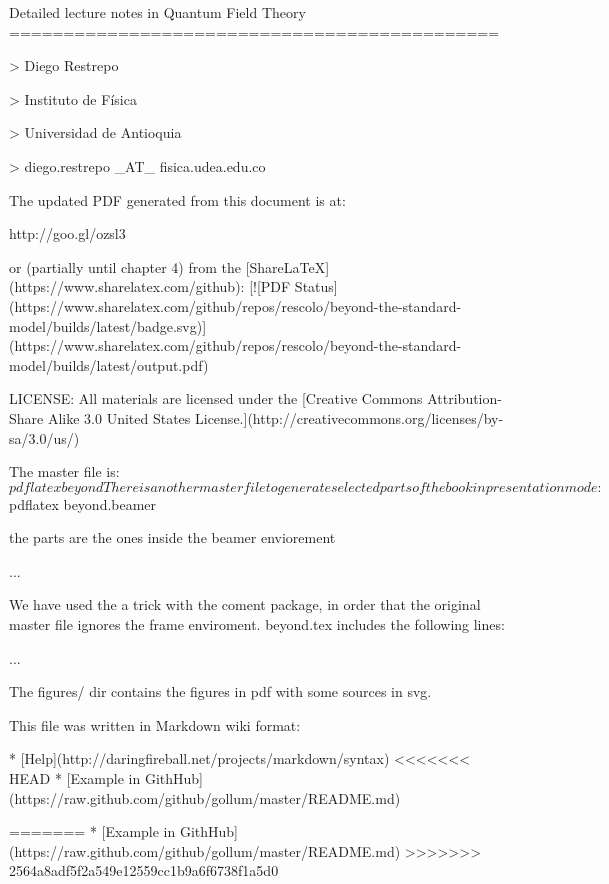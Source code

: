 Detailed lecture notes in Quantum Field Theory
=============================================



> Diego Restrepo

> Instituto de Física

> Universidad de Antioquia

> diego.restrepo _AT_ fisica.udea.edu.co

The updated PDF generated from this document is at:

http://goo.gl/ozsl3

or (partially until chapter 4) from the [ShareLaTeX](https://www.sharelatex.com/github): [![PDF Status](https://www.sharelatex.com/github/repos/rescolo/beyond-the-standard-model/builds/latest/badge.svg)](https://www.sharelatex.com/github/repos/rescolo/beyond-the-standard-model/builds/latest/output.pdf)

LICENSE: All materials are licensed under the [Creative Commons Attribution-Share Alike 3.0 United States License.](http://creativecommons.org/licenses/by-sa/3.0/us/)

The master file is:
    $ pdflatex beyond

There is another master file to generate selected parts of the book in
presentation mode:

    $ pdflatex beyond.beamer


the parts are the ones inside the beamer enviorement

    \begin{frame}
    ...
    \end{frame}

We have used the a trick with the coment package, in order that the
original master file ignores the frame enviroment. beyond.tex includes
the following lines:

    \usepackage{comment}
    ...	
    {\begingroup}{\endgroup}

The figures/ dir contains the figures in pdf with some sources in svg.

This file was written in Markdown wiki format: 

* [Help](http://daringfireball.net/projects/markdown/syntax)
<<<<<<< HEAD
* [Example in GithHub](https://raw.github.com/github/gollum/master/README.md)



=======
* [Example in GithHub](https://raw.github.com/github/gollum/master/README.md)
>>>>>>> 2564a8adf5f2a549e12559cc1b9a6f6738f1a5d0